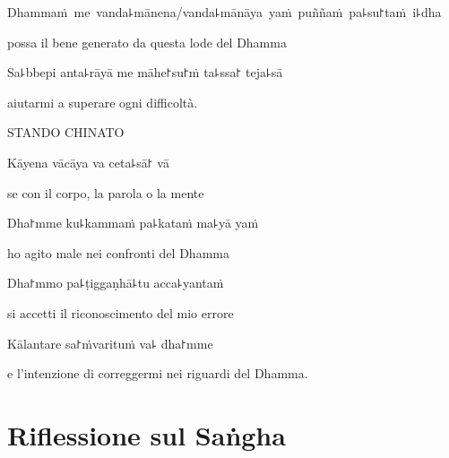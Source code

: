 \mbox{Dhammaṁ me vanda꜕mānena/vanda꜕mānāya yaṁ puññaṁ pa꜕su꜓taṁ i꜕dha}\\

\begin{english}
 possa il bene generato da questa lode del Dhamma \\
\end{english}


Sa꜕bbepi anta꜕rāyā me māhe꜓su꜓ṁ ta꜕ssa꜓ teja꜕sā
\begin{english}
  aiutarmi a superare ogni difficoltà.
\end{english}



\clearpage


\begin{instruction}
  STANDO CHINATO
\end{instruction}

Kāyena vācāya va ceta꜕sā꜓ vā\\
\begin{english}
se con il corpo, la parola o la mente \\
\end{english}

Dha꜓mme ku꜕kammaṁ pa꜕kataṁ ma꜕yā yaṁ\\
\begin{english} 
ho agito male nei confronti del Dhamma\\
\end{english} 

Dha꜓mmo pa꜕ṭiggaṇhā꜕tu acca꜕yantaṁ\\
\begin{english}
si accetti il riconoscimento del mio errore \\
\end{english} 

Kālantare sa꜓ṁvarituṁ va꜕ dha꜓mme
\begin{english}
  e l'intenzione di correggermi nei riguardi del Dhamma.
\end{english}

\clearpage


\chapter*{Riflessione sul Saṅgha}

\delegateSetUseNext

\begin{leader}
\end{leader}


